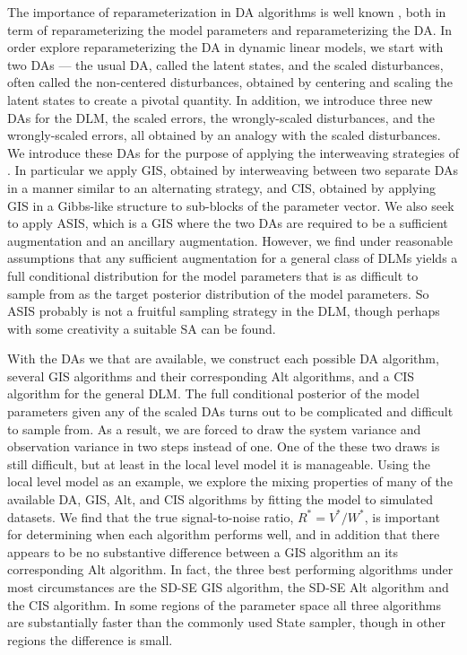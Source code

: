 \documentclass[12pt]{article}
\begin{document}
The importance of reparameterization in DA algorithms is well known \citep{papaspiliopoulos2007general}, both in term of reparameterizing the model parameters and reparameterizing the DA. In order explore reparameterizing the DA in dynamic linear models, we start with two DAs --- the usual DA, called the latent states, and the scaled disturbances, often called the non-centered disturbances, obtained by centering and scaling the latent states to create a pivotal quantity. In addition, we introduce three new DAs for the DLM, the scaled errors, the wrongly-scaled disturbances, and the wrongly-scaled errors, all obtained by an analogy with the scaled disturbances. We introduce these DAs for the purpose of applying the interweaving strategies of \citet{yu2011center}. In particular we apply GIS, obtained by interweaving between two separate DAs in a manner similar to an alternating strategy, and CIS, obtained by applying GIS in a Gibbs-like structure to sub-blocks of the parameter vector. We also seek to apply ASIS, which is a GIS where the two DAs are required to be a sufficient augmentation and an ancillary augmentation. However, we find under reasonable assumptions that any sufficient augmentation for a general class of DLMs yields a full conditional distribution for the model parameters that is as difficult to sample from as the target posterior distribution of the model parameters. So ASIS probably is not a fruitful sampling strategy in the DLM, though perhaps with some creativity a suitable SA can be found.

With the DAs we that are available, we construct each possible DA algorithm, several GIS algorithms and their corresponding Alt algorithms, and a CIS algorithm for the general DLM. The full conditional posterior of the model parameters given any of the scaled DAs turns out to be complicated and difficult to sample from. As a result, we are forced to draw the system variance and observation variance in two steps instead of one. One of the these two draws is still difficult, but at least in the local level model it is manageable. Using the local level model as an example, we explore the mixing properties of many of the available DA, GIS, Alt, and CIS algorithms by fitting the model to simulated datasets. We find that the true signal-to-noise ratio, $R^*=V^*/W^*$, is important for determining when each algorithm performs well, and in addition that there appears to be no substantive difference between a GIS algorithm an its corresponding Alt algorithm. In fact, the three best performing algorithms under most circumstances are the SD-SE GIS algorithm, the SD-SE Alt algorithm and the CIS algorithm. In some regions of the parameter space all three algorithms are substantially faster than the commonly used State sampler, though in other regions the difference is small.
\end{document}
